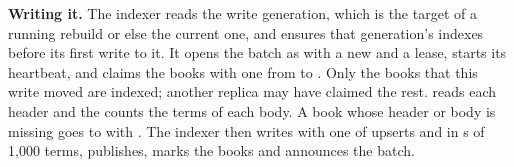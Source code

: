 \textbf{Writing it.} The indexer reads the write generation, which is the target of a running rebuild or else the
current one, and ensures that generation's indexes before its first write to it. It opens the batch as 
with a new  and a lease, starts its heartbeat, and claims the books with one  from
 to . Only the books that this write moved are indexed; another replica may have claimed
the rest.  reads each header and the  counts the terms of each body. A book whose
header or body is missing goes to  with . The indexer then writes  with
one  of upserts and  in s of 1{,}000 terms, publishes, marks the
books  and announces the batch.

